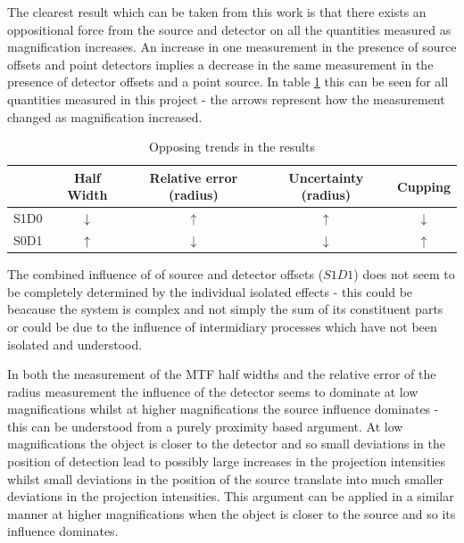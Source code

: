 \documentclass[
  twoside,
  11pt, a4paper,
  footinclude=true,
  headinclude=true,
  cleardoublepage=empty
]{scrbook}
\begin{document}
The clearest result which can be taken from this work is that there exists an oppositional force from the source and detector on all the quantities measured as magnification increases. An increase in one measurement in the presence of source offsets and point detectors implies a decrease in the same measurement in the presence of detector offsets and a point source. In table \ref{upsanddowns} this can be seen for all quantities measured in this project - the arrows represent how the measurement changed as magnification increased.

\begin{table}
\caption{Opposing trends in the results}
\label{upsanddowns}
\begin{tabular}{c|cccc}
\toprule
{}  &     Half Width &     Relative error (radius)  &  Uncertainty (radius) &  Cupping\\
\midrule
S1D0     &    $\downarrow$ & $\uparrow$ & $\uparrow$ & $\downarrow$ \\
S0D1     &    $\uparrow$ & $\downarrow$ & $\downarrow$ & $\uparrow$ \\
\bottomrule
\end{tabular}
\end{table}

The combined influence of of source and detector offsets ($S1D1$) does not seem to be completely determined by the individual isolated effects - this could be beacause the system is complex and not simply the sum of its constituent parts or could be due to the influence of intermidiary processes which have not been isolated and understood.

In both the measurement of the MTF half widths and the relative error of the radius measurement the influence of the detector seems to dominate at low magnifications whilst at higher magnifications the source influence dominates - this can be understood from a purely proximity based argument. At low magnifications the object is closer to the detector and so small deviations in the position of detection lead to possibly large increases in the projection intensities whilst small deviations in the position of the source translate into much smaller deviations in the projection intensities. This argument can be applied in a similar manner at higher magnifications when the object is closer to the source and so its influence dominates.
\end{document}
